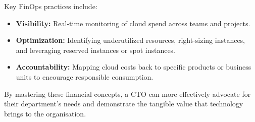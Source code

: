Key \gls{FinOps} practices include:
\begin{itemize}
    \item \textbf{Visibility:} Real-time monitoring of cloud spend across teams and projects.
    \item \textbf{Optimization:} Identifying underutilized resources, right-sizing instances, and leveraging reserved instances or spot instances.
    \item \textbf{Accountability:} Mapping cloud costs back to specific products or business units to encourage responsible consumption.
\end{itemize}

By mastering these financial concepts, a \gls{CTO} can more effectively advocate for their department's needs and demonstrate the tangible value that technology brings to the organisation.
